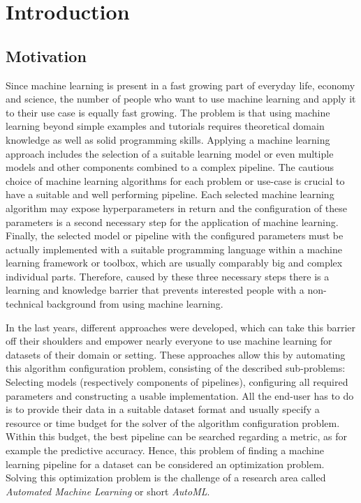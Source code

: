 %
\chapter{Introduction}
\label{sec:intro}

\section{Motivation}
\label{sec:intro:motivation}

Since machine learning is present in a fast growing part of everyday life, economy and science, the number of people who want to use machine learning and apply it to their use case is equally fast growing.
The problem is that using machine learning beyond simple examples and tutorials requires theoretical domain knowledge as well as solid programming skills.\newline
Applying a machine learning approach includes the selection of a suitable learning model or even multiple models and other components combined to a complex pipeline.
The cautious choice of machine learning algorithms for each problem or use-case is crucial to have a suitable and well performing pipeline.
Each selected machine learning algorithm may expose hyperparameters in return and the configuration of these parameters is a second necessary step for the application of machine learning.
Finally, the selected model or pipeline with the configured parameters must be actually implemented with a suitable programming language within a machine learning framework or toolbox, which are usually comparably big and complex individual parts.
Therefore, caused by these three necessary steps there is a learning and knowledge barrier that prevents interested people with a non-technical background from using machine learning.

In the last years, different approaches were developed, which can take this barrier off their shoulders and empower nearly everyone to use machine learning for datasets of their domain or setting.
These approaches allow this by automating this algorithm configuration problem, consisting of the described sub-problems: Selecting models (respectively components of pipelines), configuring all required parameters and constructing a usable implementation.
All the end-user has to do is to provide their data in a suitable dataset format and usually specify a resource or time budget for the solver of the algorithm configuration problem.\newline
Within this budget, the best pipeline can be searched regarding a metric, as for example the predictive accuracy.
Hence, this problem of finding a machine learning pipeline for a dataset can be considered an optimization problem.
Solving this optimization problem is the challenge of a research area called \textit{Automated Machine Learning} or short \textit{AutoML}.

